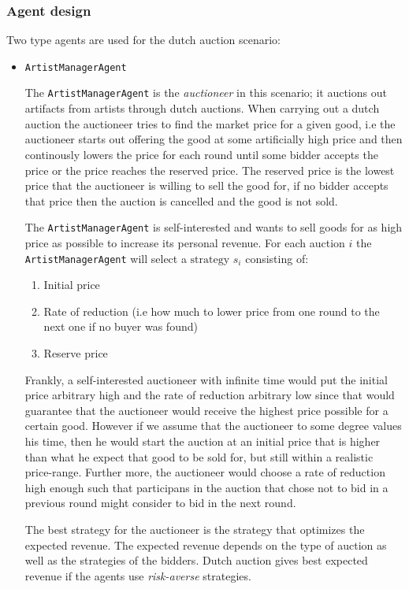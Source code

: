 \documentclass[a4paper, 11pt]{article}
\begin{document}
\subsubsection*{Agent design}
Two type agents are used for the dutch auction scenario:
\begin{itemize} 
\item \texttt{ArtistManagerAgent} 

The \texttt{ArtistManagerAgent} is the \textit{auctioneer} in this scenario; it auctions out artifacts from artists through dutch auctions. When carrying out a dutch auction the auctioneer tries to find the market price for a given good, i.e the auctioneer starts out offering the good at some artificially high price and then continously lowers the price for each round until some bidder accepts the price or the price reaches the reserved price. The reserved price is the lowest price that the auctioneer is willing to sell the good for, if no bidder accepts that price then the auction is cancelled and the good is not sold. 

The \texttt{ArtistManagerAgent} is self-interested and wants to sell goods for as high price as possible to increase its personal revenue. For each auction $i$ the  \texttt{ArtistManagerAgent} will select a $\text{strategy }s_i$ consisting of:
\begin{enumerate}[I]
\item Initial price
\item Rate of reduction (i.e how much to lower price from one round to the next one if no buyer was found)
\item Reserve price
\end{enumerate}
Frankly, a self-interested auctioneer with infinite time would put the initial price arbitrary high and the rate of reduction arbitrary low since that would guarantee that the auctioneer would receive the highest price possible for a certain good. However if we assume that the auctioneer to some degree values his time, then he would start the auction at an initial price that is higher than what he expect that good to be sold for, but still within a realistic price-range. Further more, the auctioneer would choose a rate of reduction high enough such that participans in the auction that chose not to bid in a previous round might consider to bid in the next round. 

The best strategy for the auctioneer is the strategy that optimizes the expected revenue. The expected revenue depends on the type of auction as well as the strategies of the bidders. Dutch auction gives best expected revenue if the agents use \textit{risk-averse} strategies.


\end{itemize}
\end{document}
